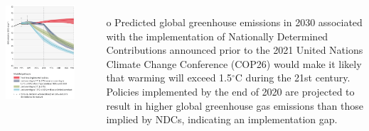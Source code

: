 \begin{frame}
  \begin{scriptsize}

    \vspace{-0.1cm}
    \begin{columns}
      \begin{center}
          \includegraphics[width=1.0\textwidth]{plots/WG3_global_GHG_emissions.png}
      \end{center}  
      

      \begin{itemize}\setlength\itemsep{1.9ex}        
        \item[o] Predicted global greenhouse emissions in 2030 associated with the implementation of Nationally Determined
        Contributions announced prior to the 2021 United Nations Climate Change Conference (COP26) would make it likely that warming will exceed 1.5$^\circ$C during the 21st century. Policies implemented by the end of 2020 are projected to result in higher global greenhouse gas emissions than those implied by NDCs, indicating an implementation gap.


\end{itemize}
\end{columns}
\end{scriptsize}
\end{frame}
